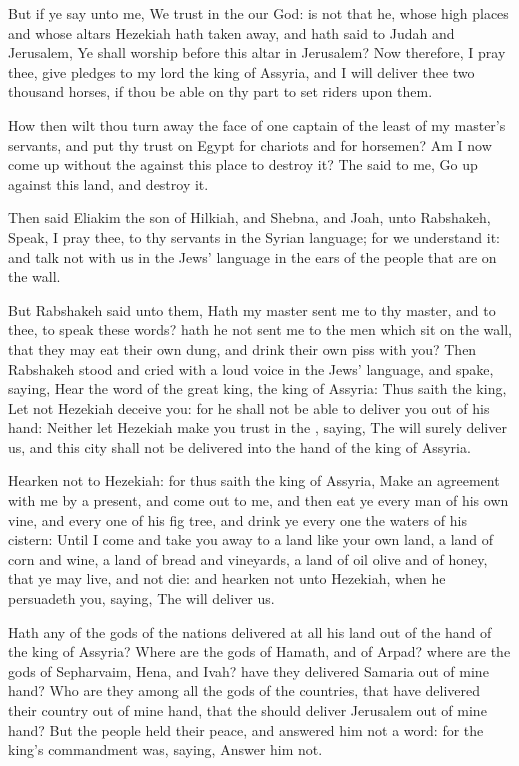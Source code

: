 \Verse But if ye say unto me, We trust in the \LORD our God: is not that he, whose high places and whose altars Hezekiah hath taken away, and hath said to Judah and Jerusalem, Ye shall worship before this altar in Jerusalem?  \Verse Now therefore, I pray thee, give pledges to my lord the king of Assyria, and I will deliver thee two thousand horses, if thou be able on thy part to set riders upon them.

\Verse How then wilt thou turn away the face of one captain of the least of my master's servants, and put thy trust on Egypt for chariots and for horsemen?  \Verse Am I now come up without the \LORD against this place to destroy it?  The \LORD said to me, Go up against this land, and destroy it.

\Verse Then said Eliakim the son of Hilkiah, and Shebna, and Joah, unto Rabshakeh, Speak, I pray thee, to thy servants in the Syrian language; for we understand it: and talk not with us in the Jews' language in the ears of the people that are on the wall.

\Verse But Rabshakeh said unto them, Hath my master sent me to thy master, and to thee, to speak these words? hath he not sent me to the men which sit on the wall, that they may eat their own dung, and drink their own piss with you?  \Verse Then Rabshakeh stood and cried with a loud voice in the Jews' language, and spake, saying, Hear the word of the great king, the king of Assyria: \Verse Thus saith the king, Let not Hezekiah deceive you: for he shall not be able to deliver you out of his hand: \Verse Neither let Hezekiah make you trust in the \LORD, saying, The \LORD will surely deliver us, and this city shall not be delivered into the hand of the king of Assyria.

\Verse Hearken not to Hezekiah: for thus saith the king of Assyria, Make an agreement with me by a present, and come out to me, and then eat ye every man of his own vine, and every one of his fig tree, and drink ye every one the waters of his cistern: \Verse Until I come and take you away to a land like your own land, a land of corn and wine, a land of bread and vineyards, a land of oil olive and of honey, that ye may live, and not die: and hearken not unto Hezekiah, when he persuadeth you, saying, The \LORD will deliver us.

\Verse Hath any of the gods of the nations delivered at all his land out of the hand of the king of Assyria?  \Verse Where are the gods of Hamath, and of Arpad? where are the gods of Sepharvaim, Hena, and Ivah? have they delivered Samaria out of mine hand?  \Verse Who are they among all the gods of the countries, that have delivered their country out of mine hand, that the \LORD should deliver Jerusalem out of mine hand?  \Verse But the people held their peace, and answered him not a word: for the king's commandment was, saying, Answer him not.

